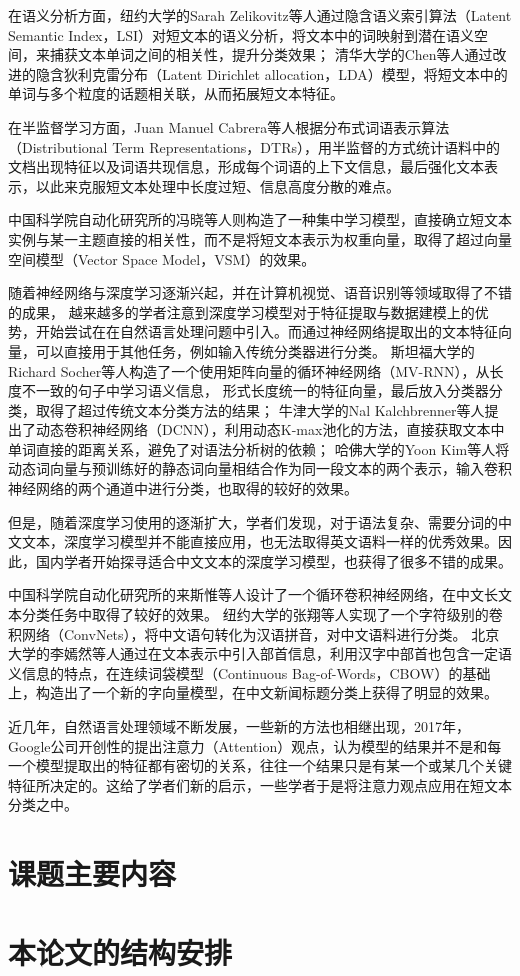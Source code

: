 在语义分析方面，纽约大学的Sarah Zelikovitz等人通过隐含语义索引算法（Latent Semantic Index，LSI）对短文本的语义分析，将文本中的词映射到潜在语义空间，来捕获文本单词之间的相关性，提升分类效果；
清华大学的Chen等人通过改进的隐含狄利克雷分布（Latent Dirichlet allocation，LDA）模型，将短文本中的单词与多个粒度的话题相关联，从而拓展短文本特征。

在半监督学习方面，Juan Manuel Cabrera等人根据分布式词语表示算法（Distributional Term Representations，DTRs），用半监督的方式统计语料中的文档出现特征以及词语共现信息，形成每个词语的上下文信息，最后强化文本表示，以此来克服短文本处理中长度过短、信息高度分散的难点。

中国科学院自动化研究所的冯晓等人则构造了一种集中学习模型，直接确立短文本实例与某一主题直接的相关性，而不是将短文本表示为权重向量，取得了超过向量空间模型（Vector Space Model，VSM）的效果。

随着神经网络与深度学习逐渐兴起，并在计算机视觉、语音识别等领域取得了不错的成果，
越来越多的学者注意到深度学习模型对于特征提取与数据建模上的优势，开始尝试在在自然语言处理问题中引入。而通过神经网络提取出的文本特征向量，可以直接用于其他任务，例如输入传统分类器进行分类。
斯坦福大学的Richard Socher等人构造了一个使用矩阵向量的循环神经网络（MV-RNN），从长度不一致的句子中学习语义信息，
形式长度统一的特征向量，最后放入分类器分类，取得了超过传统文本分类方法的结果；
牛津大学的Nal Kalchbrenner等人提出了动态卷积神经网络（DCNN），利用动态K-max池化的方法，直接获取文本中单词直接的距离关系，避免了对语法分析树的依赖；
哈佛大学的Yoon Kim等人将动态词向量与预训练好的静态词向量相结合作为同一段文本的两个表示，输入卷积神经网络的两个通道中进行分类，也取得的较好的效果。

但是，随着深度学习使用的逐渐扩大，学者们发现，对于语法复杂、需要分词的中文文本，深度学习模型并不能直接应用，也无法取得英文语料一样的优秀效果。因此，国内学者开始探寻适合中文文本的深度学习模型，也获得了很多不错的成果。

中国科学院自动化研究所的来斯惟等人设计了一个循环卷积神经网络，在中文长文本分类任务中取得了较好的效果。
纽约大学的张翔等人实现了一个字符级别的卷积网络（ConvNets），将中文语句转化为汉语拼音，对中文语料进行分类。
北京大学的李嫣然等人通过在文本表示中引入部首信息，利用汉字中部首也包含一定语义信息的特点，在连续词袋模型（Continuous Bag-of-Words，CBOW）的基础上，构造出了一个新的字向量模型，在中文新闻标题分类上获得了明显的效果。

近几年，自然语言处理领域不断发展，一些新的方法也相继出现，2017年，Google公司开创性的提出注意力（Attention）观点，认为模型的结果并不是和每一个模型提取出的特征都有密切的关系，往往一个结果只是有某一个或某几个关键特征所决定的。这给了学者们新的启示，一些学者于是将注意力观点应用在短文本分类之中。
\section{课题主要内容}
\section{本论文的结构安排}
